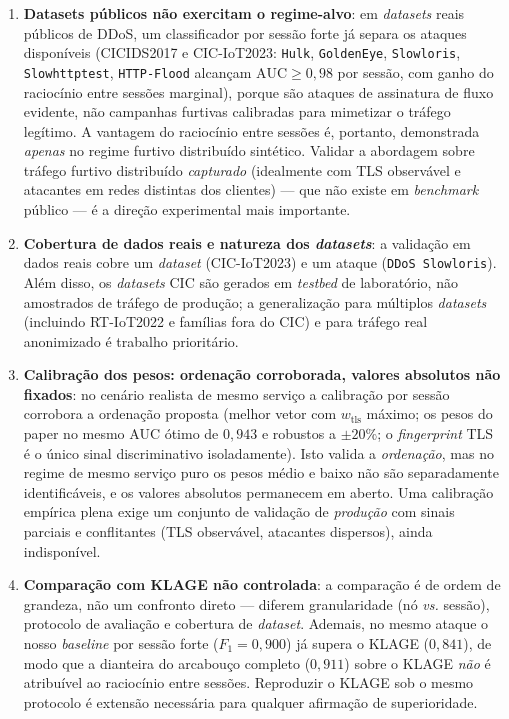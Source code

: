 \documentclass[preprint,12pt]{elsarticle}
\begin{document}
\begin{enumerate}
    \item \textbf{Datasets públicos não exercitam o regime-alvo}: em \emph{datasets} reais públicos de DDoS, um classificador por sessão forte já separa os ataques disponíveis (CICIDS2017 e CIC-IoT2023: \texttt{Hulk}, \texttt{GoldenEye}, \texttt{Slowloris}, \texttt{Slowhttptest}, \texttt{HTTP-Flood} alcançam $\text{AUC} \geq 0{,}98$ por sessão, com ganho do raciocínio entre sessões marginal), porque são ataques de assinatura de fluxo evidente, não campanhas furtivas calibradas para mimetizar o tráfego legítimo. A vantagem do raciocínio entre sessões é, portanto, demonstrada \emph{apenas} no regime furtivo distribuído sintético. Validar a abordagem sobre tráfego furtivo distribuído \emph{capturado} (idealmente com TLS observável e atacantes em redes distintas dos clientes) --- que não existe em \emph{benchmark} público --- é a direção experimental mais importante.

    \item \textbf{Cobertura de dados reais e natureza dos \emph{datasets}}: a validação em dados reais cobre um \emph{dataset} (CIC-IoT2023) e um ataque (\texttt{DDoS Slowloris}). Além disso, os \emph{datasets} CIC são gerados em \emph{testbed} de laboratório, não amostrados de tráfego de produção; a generalização para múltiplos \emph{datasets} (incluindo RT-IoT2022 e famílias fora do CIC) e para tráfego real anonimizado é trabalho prioritário.

    \item \textbf{Calibração dos pesos: ordenação corroborada, valores absolutos não fixados}: no cenário realista de mesmo serviço a calibração por sessão corrobora a ordenação proposta (melhor vetor com $w_{\text{tls}}$ máximo; os pesos do paper no mesmo AUC ótimo de $0{,}943$ e robustos a $\pm 20\%$; o \emph{fingerprint} TLS é o único sinal discriminativo isoladamente). Isto valida a \emph{ordenação}, mas no regime de mesmo serviço puro os pesos médio e baixo não são separadamente identificáveis, e os valores absolutos permanecem em aberto. Uma calibração empírica plena exige um conjunto de validação de \emph{produção} com sinais parciais e conflitantes (TLS observável, atacantes dispersos), ainda indisponível.

    \item \textbf{Comparação com KLAGE não controlada}: a comparação é de ordem de grandeza, não um confronto direto --- diferem granularidade (nó \emph{vs.} sessão), protocolo de avaliação e cobertura de \emph{dataset}. Ademais, no mesmo ataque o nosso \emph{baseline} por sessão forte ($F_1 = 0{,}900$) já supera o KLAGE ($0{,}841$), de modo que a dianteira do arcabouço completo ($0{,}911$) sobre o KLAGE \emph{não} é atribuível ao raciocínio entre sessões. Reproduzir o KLAGE sob o mesmo protocolo é extensão necessária para qualquer afirmação de superioridade.


\end{enumerate}
\end{document}

